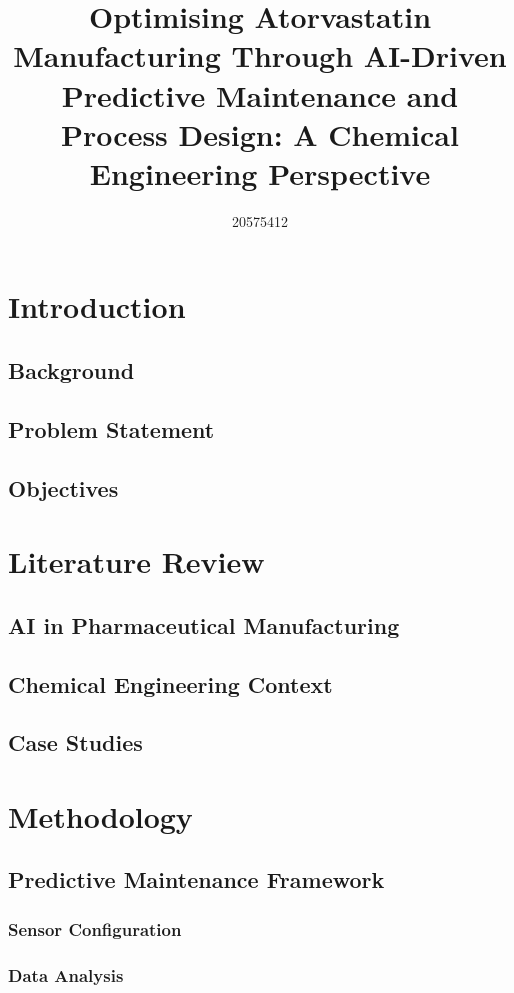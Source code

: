 \documentclass[fleqn,10pt]{olplainarticle}
\title{Optimising Atorvastatin Manufacturing Through AI-Driven Predictive Maintenance and Process Design: A Chemical Engineering Perspective}
\author[1]{20575412}
\begin{document}
\flushbottom
\maketitle
\thispagestyle{empty}



	

\section*{Introduction}

\subsection{Background}
\subsection{Problem Statement}
\subsection{Objectives}
\section{Literature Review}
\subsection{AI in Pharmaceutical Manufacturing}
\subsection{Chemical Engineering Context}
\subsection{Case Studies}
\section{Methodology}
\subsection{Predictive Maintenance Framework}
\subsubsection{Sensor Configuration}
\subsubsection{Data Analysis}
\end{document}
